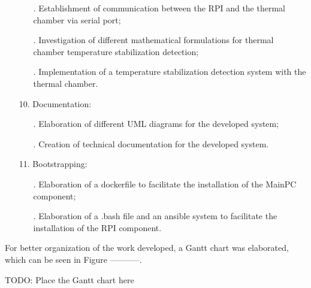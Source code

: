 \begin{itemize}
\begin{itemize}
            \item[.] Establishment of communication between the RPI and the thermal chamber via serial port;
            \item[.] Investigation of different mathematical formulations for thermal chamber temperature stabilization detection;
            \item[.] Implementation of a temperature stabilization detection system with the thermal chamber.
        \end{itemize}
    \item[] 10. Documentation:
        \begin{itemize}
            \item[.] Elaboration of different UML diagrams for the developed system;
            \item[.] Creation of technical documentation for the developed system.
        \end{itemize}
    \item[] 11. Bootstrapping:
        \begin{itemize}
            \item[.] Elaboration of a dockerfile to facilitate the installation of the MainPC component;
            \item[.] Elaboration of a .bash file and an ansible system to facilitate the installation of the RPI component.
        \end{itemize}
\end{itemize}

For better organization of the work developed, a Gantt chart was elaborated, which can be seen in Figure -----------.

TODO: Place the Gantt chart here